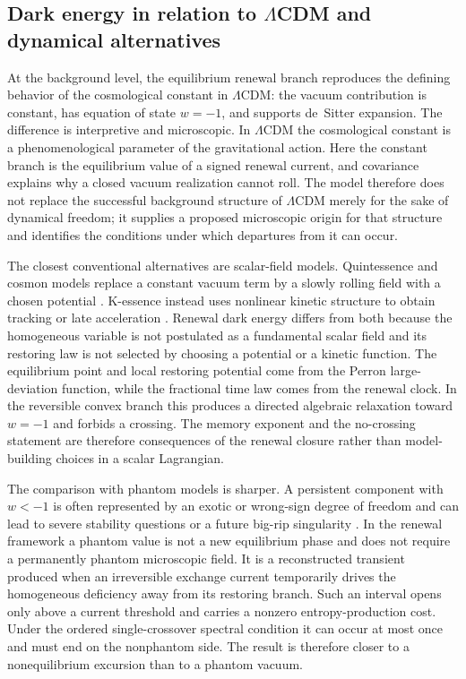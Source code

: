 \documentclass[11pt]{article}
\theoremstyle{definition}
\theoremstyle{remark}
\begin{document}
\subsection{Dark energy in relation to \texorpdfstring{$\Lambda$}{Lambda}CDM and dynamical alternatives}

At the background level, the equilibrium renewal branch reproduces the defining behavior of the cosmological constant in $\Lambda$CDM: the vacuum contribution is constant, has equation of state $w=-1$, and supports de~Sitter expansion.  The difference is interpretive and microscopic.  In $\Lambda$CDM the cosmological constant is a phenomenological parameter of the gravitational action.  Here the constant branch is the equilibrium value of a signed renewal current, and covariance explains why a closed vacuum realization cannot roll.  The model therefore does not replace the successful background structure of $\Lambda$CDM merely for the sake of dynamical freedom; it supplies a proposed microscopic origin for that structure and identifies the conditions under which departures from it can occur.

The closest conventional alternatives are scalar-field models.  Quintessence and cosmon models replace a constant vacuum term by a slowly rolling field with a chosen potential \cite{RatraPeebles1988,Wetterich1988,CaldwellDaveSteinhardt}.  K-essence instead uses nonlinear kinetic structure to obtain tracking or late acceleration \cite{ArmendarizPiconKessence}.  Renewal dark energy differs from both because the homogeneous variable is not postulated as a fundamental scalar field and its restoring law is not selected by choosing a potential or a kinetic function.  The equilibrium point and local restoring potential come from the Perron large-deviation function, while the fractional time law comes from the renewal clock.  In the reversible convex branch this produces a directed algebraic relaxation toward $w=-1$ and forbids a crossing.  The memory exponent and the no-crossing statement are therefore consequences of the renewal closure rather than model-building choices in a scalar Lagrangian.

The comparison with phantom models is sharper.  A persistent component with $w<-1$ is often represented by an exotic or wrong-sign degree of freedom and can lead to severe stability questions or a future big-rip singularity \cite{CaldwellPhantom}.  In the renewal framework a phantom value is not a new equilibrium phase and does not require a permanently phantom microscopic field.  It is a reconstructed transient produced when an irreversible exchange current temporarily drives the homogeneous deficiency away from its restoring branch.  Such an interval opens only above a current threshold and carries a nonzero entropy-production cost.  Under the ordered single-crossover spectral condition it can occur at most once and must end on the nonphantom side.  The result is therefore closer to a nonequilibrium excursion than to a phantom vacuum.
\end{document}
